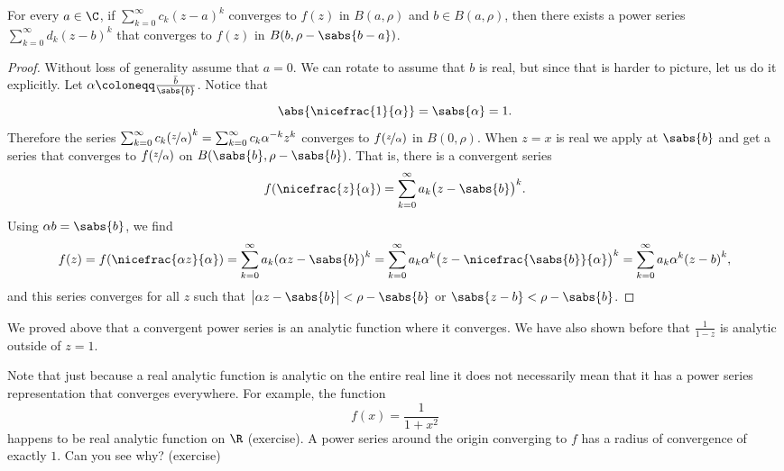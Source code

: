 \begin{cor} \label{cor:powerseranalytic}
For every $a \in \C$,
if $\sum_{k=0}^\infty c_k {(z-a)}^k$ converges to $f(z)$ in $B(a,\rho)$ and $b \in
B(a,\rho)$,
then there exists a power series
$\sum_{k=0}^\infty d_k {(z-b)}^k$ that converges to $f(z)$ in $B(b,\rho-\sabs{b-a})$.
\end{cor}

\begin{proof}
Without loss of generality assume that $a=0$.  We can rotate to assume that $b$ is real, but
since that is harder to picture, let us do it explicitly.
Let $\alpha \coloneqq \frac{\bar{b}}{\sabs{b}}$.
Notice that
\begin{equation*}
\abs{\nicefrac{1}{\alpha}} = \sabs{\alpha}
= 1 .
\end{equation*}
Therefore the series
$\sum_{k=0}^\infty c_k {(\nicefrac{z}{\alpha})}^k = 
\sum_{k=0}^\infty c_k \alpha^{-k} {z}^k$
converges to $f(\nicefrac{z}{\alpha})$ in $B(0,\rho)$.
When $z=x$ is real
we apply  at $\sabs{b}$ and get
a series that converges
to $f(\nicefrac{z}{\alpha})$ on $B(\sabs{b},\rho-\sabs{b})$.
That is, there is a convergent series
\begin{equation*}
f(\nicefrac{z}{\alpha}) =
\sum_{k=0}^\infty a_k {\bigl(z - \sabs{b}\bigr)}^k .
\end{equation*}
Using $\alpha b = \sabs{b}$, we find
\begin{equation*}
f(z) = f(\nicefrac{\alpha z}{\alpha}) =
\sum_{k=0}^\infty a_k {(\alpha z - \sabs{b})}^k 
=
\sum_{k=0}^\infty a_k\alpha^k {\bigl(z - \nicefrac{\sabs{b}}{\alpha}\bigr)}^k
=
\sum_{k=0}^\infty a_k\alpha^k {(z - b)}^k ,
\end{equation*}
and this series converges for all $z$ such that
$\bigl\lvert \alpha z-\sabs{b}\bigr\rvert < \rho-\sabs{b}$
or $\sabs{z - b} < \rho-\sabs{b}$.
\end{proof}

We proved above that a convergent power series is an
analytic function where it converges.  We have also shown before that
$\frac{1}{1-z}$ is analytic outside of $z=1$.

Note that just because a real analytic function is analytic on the
entire real line it does not necessarily mean that it has a power series
representation that converges everywhere.  For example, the function
\begin{equation*}
f(x) = \frac{1}{1+x^2}
\end{equation*}
happens to be real analytic function on $\R$ (exercise).  A power
series around the origin converging to $f$
has a radius of convergence of exactly $1$.
Can you see why? (exercise)

